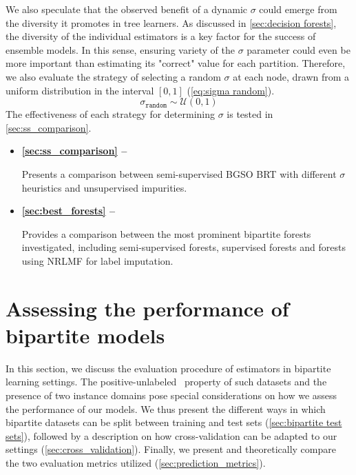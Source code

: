 We also speculate that the observed benefit of a dynamic $\sigma$ could emerge from the diversity it promotes in tree learners. As discussed in \autoref{sec:decision forests}, the diversity of the individual estimators is a key factor for the success of ensemble models. In this sense, ensuring variety of the $\sigma$ parameter could even be more important than estimating its "correct" value for each partition. Therefore, we also evaluate the strategy of selecting a random $\sigma$ at each node, drawn from a uniform distribution in the interval $[0, 1]$ (\autoref{eq:sigma random}).
%
\begin{equation}
    \sigma_\texttt{random} \sim \mathcal{U}(0, 1)
    \label{eq:sigma random}
\end{equation}
%
The effectiveness of each strategy for determining $\sigma$ is tested in \autoref{sec:ss_comparison}.

\begin{mdframed}[frametitle={Related experiments}]

   \begin{itemize}
    \item \textbf{\autoref{sec:ss_comparison} -- }

    Presents a comparison between semi-supervised BGSO BRT with different $\sigma$ heuristics and unsupervised impurities.

    \item \textbf{\autoref{sec:best_forests} -- }

    Provides a comparison between the most prominent bipartite forests investigated, including semi-supervised forests, supervised forests and forests using NRLMF for label imputation.

   \end{itemize}
\end{mdframed}




\section{Assessing the performance of bipartite models}
\label{sec:evaluation}

In this section, we discuss the evaluation procedure of estimators in bipartite learning settings. 
The positive-unlabeled~\cite{bekker2020learning} property of such datasets and the presence of two instance domains pose special considerations on how we assess the performance of our models.
We thus present the different ways in which bipartite datasets can be split between training and test sets (\autoref{sec:bipartite test sets}), followed by a description on how cross-validation can be adapted to our settings (\autoref{sec:cross_validation}).
Finally, we present and theoretically compare the two evaluation metrics utilized (\autoref{sec:prediction_metrics}).


